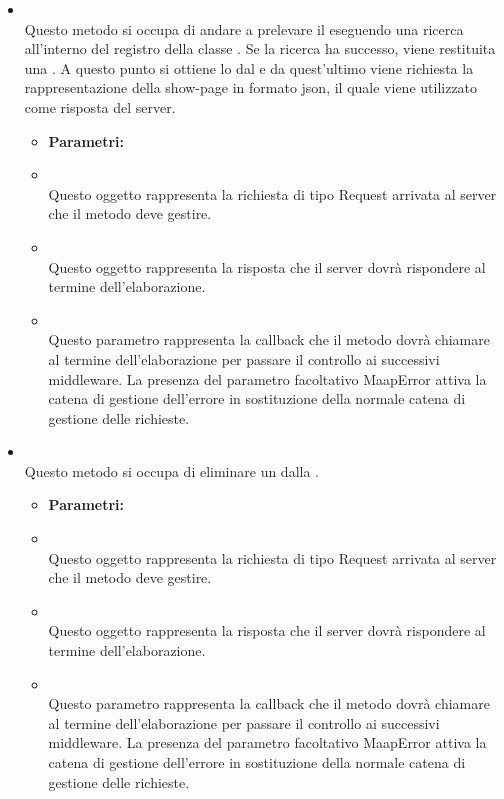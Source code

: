 \begin{itemize}
\item[] \textbf{} \\ Questo metodo si occupa di andare a prelevare il  eseguendo una ricerca all'interno del registro della classe . Se la ricerca ha successo, viene restituita una . A questo punto si ottiene lo  dal  e da quest'ultimo viene richiesta la rappresentazione della show-page in formato json, il quale viene utilizzato come risposta del server.
\begin{itemize}\addtolength{\itemsep}{-0.5\baselineskip}
\item[] \textbf{Parametri:}
\item[]  \\ Questo oggetto rappresenta la richiesta di tipo Request arrivata al server che il metodo deve gestire.
\item[]  \\ Questo oggetto rappresenta la risposta che il server dovrà rispondere al termine dell'elaborazione.
\item[]  \\ Questo parametro rappresenta la callback che il metodo dovrà chiamare al termine dell'elaborazione per passare il controllo ai successivi middleware. La presenza del parametro facoltativo MaapError attiva la catena di gestione dell'errore in sostituzione della normale catena di gestione delle richieste.
\end{itemize}
\item[] \textbf{} \\ Questo metodo si occupa di eliminare un  dalla .
\begin{itemize}\addtolength{\itemsep}{-0.5\baselineskip}
\item[] \textbf{Parametri:}
\item[]  \\ Questo oggetto rappresenta la richiesta di tipo Request arrivata al server che il metodo deve gestire.
\item[]  \\ Questo oggetto rappresenta la risposta che il server dovrà rispondere al termine dell'elaborazione.
\item[]  \\ Questo parametro rappresenta la callback che il metodo dovrà chiamare al termine dell'elaborazione per passare il controllo ai successivi middleware. La presenza del parametro facoltativo MaapError attiva la catena di gestione dell'errore in sostituzione della normale catena di gestione delle richieste.
\end{itemize}
\end{itemize}

